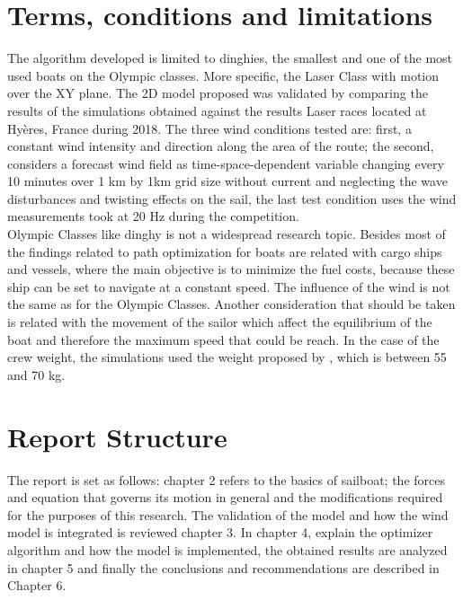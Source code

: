  \section{Terms, conditions and limitations}
The algorithm developed is limited to dinghies, the smallest and one of the most used boats on the Olympic classes. More specific, the Laser Class with motion over the XY plane.  The 2D model proposed was validated by comparing the results of the simulations obtained against the results Laser races located at Hyères, France during 2018. The three wind conditions tested are: first, a constant wind intensity and direction along the area of the route; the second, considers a forecast wind field as time-space-dependent variable changing every 10 minutes over 1 km by 1km grid size without current and neglecting the wave disturbances and twisting effects on the sail, the last test condition uses the wind measurements took at 20 Hz during the competition. 
\\
Olympic Classes like dinghy is not a widespread research topic. Besides most of the findings related to path optimization for boats are related with cargo ships and vessels, where the main objective is to minimize the fuel costs, because these ship can be set to navigate at a constant speed. The influence of the wind is not the same as for the Olympic Classes. Another consideration that should be taken is related with the movement of the sailor which affect the equilibrium of the boat and therefore the maximum speed that could be reach. In the case of the crew weight, the simulations used the weight proposed by \cite{laser_opt}, which is between	55 and 70 kg.

 
 \section{Report Structure}
The report is set as follows: chapter 2 refers to the basics of sailboat; the forces and equation that governs its motion in general and the modifications required for the purposes of this research. The validation of the model and how the wind model is integrated is reviewed chapter 3. In chapter 4, explain the optimizer algorithm and how the model is implemented,  the obtained results are analyzed in chapter 5 and finally the conclusions and recommendations are described in Chapter 6.\\

